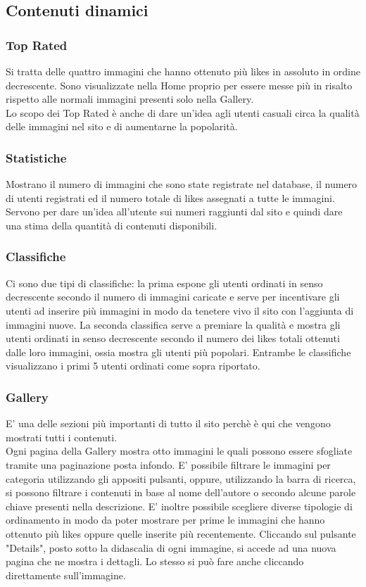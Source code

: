 \documentclass[openany, a4paper, 12pt]{report}
\begin{document}
	\subsection{Contenuti dinamici}
		\subsubsection{Top Rated}
		Si tratta delle quattro immagini che hanno ottenuto più likes in assoluto in ordine decrescente. Sono visualizzate nella Home proprio per essere messe più in risalto rispetto alle normali immagini presenti solo nella Gallery.\\
		Lo scopo dei Top Rated è anche di dare un'idea agli utenti casuali circa la qualità delle immagini nel sito e di aumentarne la popolarità.

		\subsubsection{Statistiche}
		Mostrano il numero di immagini che sono state registrate nel database, il numero di utenti registrati ed il numero totale di likes assegnati a tutte le immagini. Servono per dare un'idea all'utente sui numeri raggiunti dal sito e quindi dare una stima della quantità di contenuti disponibili.

		\subsubsection{Classifiche}
		Ci sono due tipi di classifiche: la prima espone gli utenti ordinati in senso decrescente secondo il numero di immagini caricate e serve per incentivare gli utenti ad inserire più immagini in modo da tenetere vivo il sito con l'aggiunta di immagini nuove. La seconda classifica serve a premiare la qualità e mostra gli utenti ordinati in senso decrescente secondo il numero dei likes totali ottenuti dalle loro immagini, ossia mostra gli utenti più popolari. Entrambe le classifiche visualizzano i primi 5 utenti ordinati come sopra riportato.
		
		\subsubsection{Gallery}
		E' una delle sezioni più importanti di tutto il sito perchè è qui che vengono mostrati tutti i contenuti.\\
		Ogni pagina della Gallery mostra otto immagini le quali possono essere sfogliate tramite una paginazione posta infondo. E' possibile filtrare le immagini per categoria utilizzando gli appositi pulsanti, oppure, utilizzando la barra di ricerca, si possono filtrare i contenuti in base al nome dell'autore o secondo alcune parole chiave presenti nella descrizione. E' inoltre possibile scegliere diverse tipologie di ordinamento in modo da poter mostrare per prime le immagini che hanno ottenuto più likes oppure quelle inserite più recentemente. Cliccando sul pulsante "Details", posto sotto la didascalia di ogni immagine, si accede ad una nuova pagina che ne mostra i dettagli. Lo stesso si può fare anche cliccando direttamente sull'immagine.
		
\end{document}
